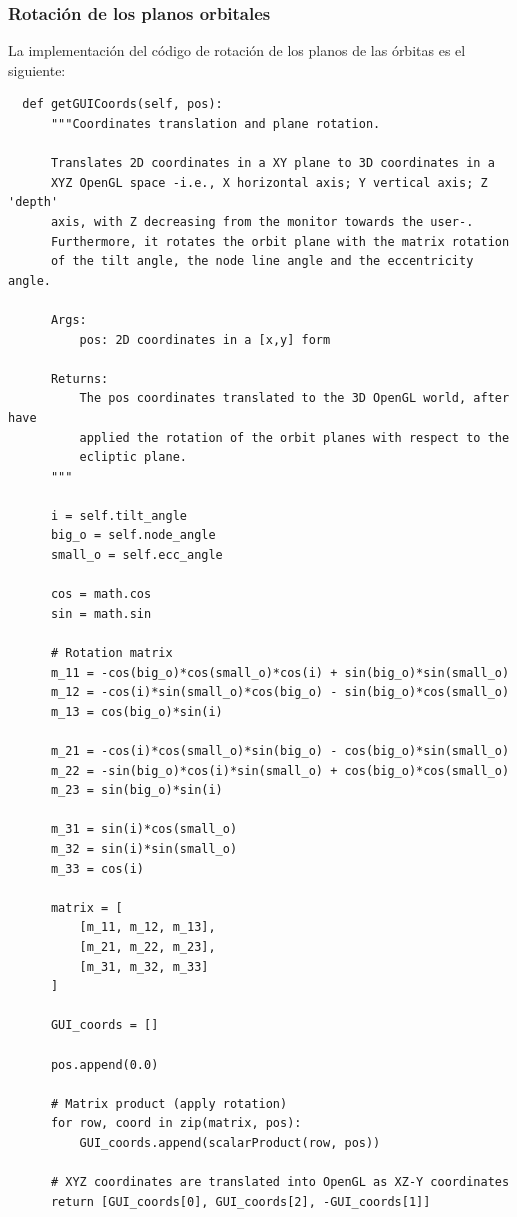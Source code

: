 \documentclass[a4paper, 11pt]{article}
\begin{document}
  \subsubsection{Rotación de los planos orbitales}

  La implementación del código de rotación de los planos de las órbitas es el siguiente:

  \begin{lstlisting}
  def getGUICoords(self, pos):
      """Coordinates translation and plane rotation.

      Translates 2D coordinates in a XY plane to 3D coordinates in a
      XYZ OpenGL space -i.e., X horizontal axis; Y vertical axis; Z 'depth'
      axis, with Z decreasing from the monitor towards the user-.
      Furthermore, it rotates the orbit plane with the matrix rotation
      of the tilt angle, the node line angle and the eccentricity angle.

      Args:
          pos: 2D coordinates in a [x,y] form

      Returns:
          The pos coordinates translated to the 3D OpenGL world, after have
          applied the rotation of the orbit planes with respect to the
          ecliptic plane.
      """

      i = self.tilt_angle
      big_o = self.node_angle
      small_o = self.ecc_angle

      cos = math.cos
      sin = math.sin

      # Rotation matrix
      m_11 = -cos(big_o)*cos(small_o)*cos(i) + sin(big_o)*sin(small_o)
      m_12 = -cos(i)*sin(small_o)*cos(big_o) - sin(big_o)*cos(small_o)
      m_13 = cos(big_o)*sin(i)

      m_21 = -cos(i)*cos(small_o)*sin(big_o) - cos(big_o)*sin(small_o)
      m_22 = -sin(big_o)*cos(i)*sin(small_o) + cos(big_o)*cos(small_o)
      m_23 = sin(big_o)*sin(i)

      m_31 = sin(i)*cos(small_o)
      m_32 = sin(i)*sin(small_o)
      m_33 = cos(i)

      matrix = [
          [m_11, m_12, m_13],
          [m_21, m_22, m_23],
          [m_31, m_32, m_33]
      ]

      GUI_coords = []

      pos.append(0.0)

      # Matrix product (apply rotation)
      for row, coord in zip(matrix, pos):
          GUI_coords.append(scalarProduct(row, pos))

      # XYZ coordinates are translated into OpenGL as XZ-Y coordinates
      return [GUI_coords[0], GUI_coords[2], -GUI_coords[1]]
  \end{lstlisting}
\end{document}
